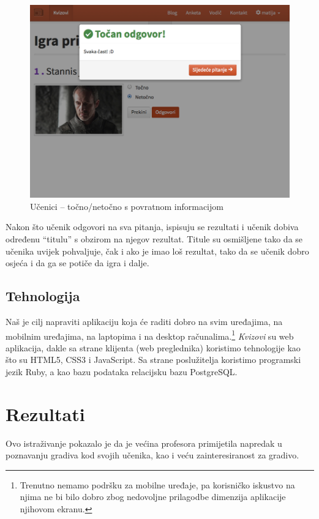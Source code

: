 \documentclass{scrreprt}
\begin{document}
\begin{figure}[H]
  \includegraphics[width=\textwidth, clip=true, trim=0 7cm 0 0, fbox]{student/boolean_question_correct}
  \caption{Učenici -- točno/netočno s povratnom informacijom}
\end{figure}

Nakon što učenik odgovori na sva pitanja, ispisuju se rezultati i učenik dobiva
određenu ``titulu'' s obzirom na njegov rezultat. Titule su osmišljene tako da
se učenika uvijek pohvaljuje, čak i ako je imao loš rezultat, tako da se učenik
dobro osjeća i da ga se potiče da igra i dalje.

\section{Tehnologija}

Naš je cilj napraviti aplikaciju koja će raditi dobro na svim uređajima, na
mobilnim uređajima, na laptopima i na desktop računalima.\footnote{Trenutno
nemamo podršku za mobilne uređaje, pa korisničko iskustvo na njima ne bi bilo
dobro zbog nedovoljne prilagodbe dimenzija aplikacije njihovom ekranu.}
\emph{Kvizovi} su web aplikacija, dakle sa strane klijenta (web preglednika)
koristimo tehnologije kao što su HTML5, CSS3 i JavaScript. Sa strane
poslužitelja koristimo programski jezik Ruby, a kao bazu podataka relacijsku
bazu PostgreSQL.

\chapter{Rezultati}

Ovo istraživanje pokazalo je da je većina profesora primijetila napredak u
poznavanju gradiva kod svojih učenika, kao i veću zainteresiranost za gradivo.
\end{document}

